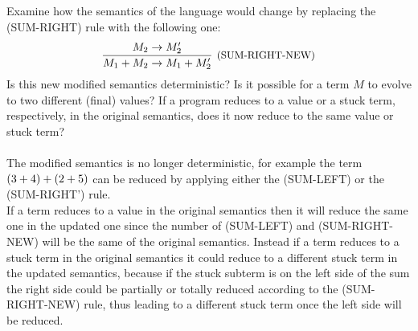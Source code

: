 \subsection{}

Examine how the semantics of the language would change by replacing the
(SUM-RIGHT) rule with the following one:
\[
	\infer[\text{\small{(SUM-RIGHT-NEW)}}]
	{\SUM{M_1}{M_2} \to \SUM{M_1}{M_2'}}
	{M_2 \to M_2'}
\]
Is this new modified semantics deterministic? Is it possible for a term $M$ to
evolve to two different (final) values? If a program reduces to a value or a
stuck term, respectively, in the original semantics, does it now reduce to
the same value or stuck term?\\~\\
The modified semantics is no longer deterministic, for example the term
$(3+4)+(2+5)$ can be reduced by applying either the
(SUM-LEFT) or the (SUM-RIGHT') rule.\\
If a term reduces to a value in the original semantics then it will reduce the
same one in the updated one since the number of (SUM-LEFT) and (SUM-RIGHT-NEW)
will be the same of the original semantics.
Instead if a term reduces to a stuck term in the original semantics it could
reduce to a different stuck term in the updated semantics, because if the
stuck subterm is on the left side of the sum the right side could be partially
or totally reduced according to the (SUM-RIGHT-NEW) rule, thus leading to a
different stuck term once the left side will be reduced.
